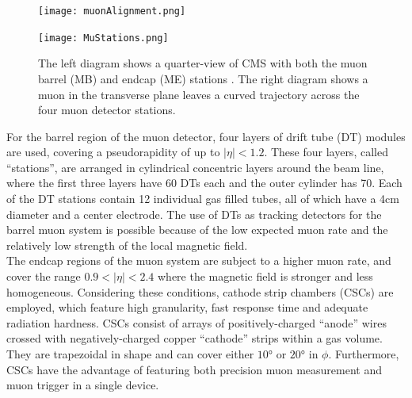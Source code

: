 \begin{figure}[H]
\begin{center}
\begin{minipage}[b]{0.59\textwidth}
\texttt{[image: muonAlignment.png]}
\end{minipage}
\hspace{1em}
\begin{minipage}[b]{0.3\textwidth}
    \texttt{[image: MuStations.png]}
\end{minipage}
\end{center}
\vspace{-1em}
\caption[Quarter-view of the CMS muon system (left) and a muon in the transverse plane leaves a curved trajectory across the four muon detector stations (right).]{The left diagram shows a quarter-view of CMS with both the muon barrel (MB) and endcap (ME) stations \cite{muonAlignment}.  The right diagram shows a muon in the transverse plane leaves a curved trajectory across the four muon detector stations\cite{MuDet}.}
\label{muonSystem}
\end{figure}

For the barrel region of the muon detector, four layers of drift tube (DT) modules are used, covering a pseudorapidity of up to $|\eta| < 1.2$. These four layers, called ``stations'', are arranged in cylindrical concentric layers around the beam line, where the first three layers have 60 DTs each and the outer cylinder has 70. Each of the DT stations contain 12 individual gas filled tubes, all of which have a 4cm diameter and a center electrode. The use of DTs as tracking detectors for the barrel muon system is possible because of the low expected muon rate and the relatively low strength of the local magnetic field.\\
 
The endcap regions of the muon system are subject to a higher muon rate, and cover the range $0.9 < |\eta| < 2.4$ where the magnetic field is stronger and less homogeneous. Considering these conditions, cathode strip chambers (CSCs) are employed, which feature high granularity, fast response time and adequate radiation hardness. CSCs consist of arrays of positively-charged ``anode'' wires crossed with negatively-charged copper ``cathode'' strips within a gas volume. They are trapezoidal in shape and can cover either $\ang{10}$ or $\ang{20}$ in $\phi$. Furthermore, CSCs have the advantage of featuring both precision muon measurement and muon trigger in a single device.\\

